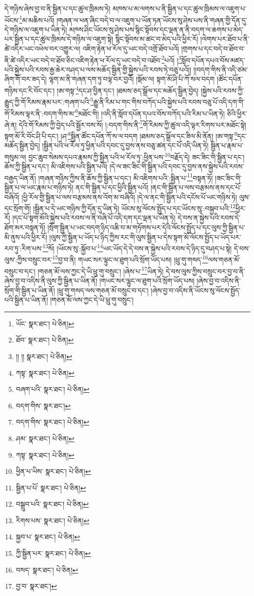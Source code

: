 དེ་གཉིས་ཞེས་བྱ་བ་ནི་སྦྱིན་པ་དང་ཚུལ་ཁྲིམས་ཏེ། མཁས་པ་མ་ལགས་པ་ནི་སྦྱིན་པ་དང་ཚུལ་ཁྲིམས་ལ་འཇུག་པ་ཡོངས་\footnote{ཡོང་  སྣར་ཐང་།  པེ་ཅིན། }མ་མཆིས་པའོ། །གཞན་ལ་ཕན་ཞིང་བདེ་བ་ལ་འཇུག་པ་ཡོན་ཏན་ཡོངས་སུ་ཤེས་པས་ནི་གཞན་གྱི་དོན་དུ་དེ་གཉིས་ལ་འཇུག་པ་ཡིན་ཏེ། མཁས་ཤིང་ཡོངས་སུ་ཤེས་པས་སྙིང་སྟོབས་དང་ལྡན་ན་ནི་བདག་ལ་ཆགས་པ་མེད་པར་སྦྱིན་པ་དང་ཚུལ་ཁྲིམས་དེ་གཉིས་ལ་འཇུག་སྟེ། སྙིང་སྟོབས་མ་ཚང་བ་མེད་པའི་ཕྱིར་རོ། །ལེགས་པར་ཐོབ་པ་ནི་ཚེ་འདིར་ཡང་འཕེལ་བར་འགྱུར་ལ། འཇིག་རྟེན་ཕ་རོལ་དུ་ཡང་བདེ་འགྲོ་ཐོབ་པའོ། །གྲགས་པ་དང་བདེ་བ་ཐོབ་བ་ནི་ཚེ་འདིར་ཡང་བདེ་བ་ཐོབ་ཅིང་འཇིག་རྟེན་ཕ་རོལ་དུ་ཡང་བདེ་བ་འཐོབ་\footnote{ཐོབ་  སྣར་ཐང་།  པེ་ཅིན། }པའོ། །\footnote{།། །།  སྣར་ཐང་།  པེ་ཅིན། }སློབ་དཔོན་དཔའ་བོས་མཛད་པའི་སྐྱེས་པའི་རབས་རྒྱ་ཆེར་བཤད་པ་ལས་མཆོད་སྦྱིན་གྱི་སྐྱེས་པའི་རབས་ཏེ་བཅུ་པའོ།། །།བདག་གིས་ནི་འདི་ཙམ་ཞིག་གོ་བར་ཟད་དེ། ལྷག་མ་ནི་གཞན་དག་ཏུ་བལྟ་བར་བྱའོ། །སྡོམ་ལ། སྟག་མོ་ཤི་པི་ཀོ་སལ་བདག །ཚོང་དཔོན་གཉིས་དང་རི་བོང་དང་། །ཨ་གསྟ་\footnote{ཀསྟ་  སྣར་ཐང་།  པེ་ཅིན། }དང་ཤ་བྱིན་དང་། །ཐམས་ཅད་སྒྲོལ་དང་མཆོད་སྦྱིན་བྱེད། །སྐྱེས་པའི་རབས་ཀྱི་རྒྱུད་ཀྱི་གོ་རིམས་རྣམ་པར་:གཞག་པའི་\footnote{བཞག་པའི་  སྣར་ཐང་།  པེ་ཅིན། }རྒྱུ་ནི་རིམ་པ་གང་གིས་བཀོད་པའི་སྐྱེས་པའི་རབས་བཅུ་པོ་འདི་དག་གི་གོ་རིམས་ལྟར་ནི་:བདག་གིས་མ་\footnote{བདག་གིས་  སྣར་ཐང་། }མཐོང་གི། །འདི་ནི་སློབ་དཔོན་དཔའ་བོས་བཀོད་པའི་རིམ་པ་ཡིན་ཏེ། ཅིའི་ཕྱིར་ཞེ་ན། དེའི་གོ་རིམས་ཀྱི་བྱེད་པའི་སྦྱོར་བས་སོ། །:བདག་གིས་ནི་\footnote{བདག་གིས་  སྣར་ཐང་།  པེ་ཅིན། }གོ་རིམས་ཀྱི་ཚུལ་འདི་ལྟར་རིགས་པར་མཐོང་སྟེ། སྟག་མོ་རི་བོང་ཤི་པི་དང་། །ཤ་\footnote{ཤམ་  སྣར་ཐང་།  པེ་ཅིན། }སྦྱིན་ཚོང་དཔོན་ཀོ་ས་ལ་བདག །ཐམས་ཅད་སྒྲོལ་དང་ཟིལ་མི་ནོན། །ཨ་གསྟ་\footnote{ཀསྟ་  སྣར་ཐང་།  པེ་ཅིན། }དང་མཆོད་སྦྱིན་བྱེད། །སྦྱིན་པའི་ཕ་རོལ་ཏུ་ཕྱིན་པའི་དབང་དུ་བྱས་ནས་བཅུ་ཚན་དང་པོ་འདི་ཡིན་ཏེ། སྦྱིན་པ་རྣམ་པ་གསུམ་ལ། བྱང་ཆུབ་སེམས་དཔའ་རྣམས་ཀྱི་སྦྱིན་པའི་ཕ་རོལ་ཏུ་:ཕྱིན་པས་\footnote{ཕྱིན་པ་ཡིས་  སྣར་ཐང་།  པེ་ཅིན། }བརྗོད་དེ། ཟང་ཟིང་གི་སྦྱིན་པ་དང་། ཆོས་ཀྱི་སྦྱིན་པ་དང་། མི་འཇིགས་པའི་སྦྱིན་པའོ། །དེ་ལ་ཟང་ཟིང་གི་སྦྱིན་པའི་དབང་དུ་བྱས་ནས་སྐྱེས་པའི་རབས་བརྒྱད་ཡིན་ནོ། །གཞན་གཉིས་ཀྱིས་ནི་ཆོས་ཀྱི་སྦྱིན་པ་དང་། མི་འཇིགས་པའི་:སྦྱིན་པ་\footnote{སྦྱིན་པ་པོ་  སྣར་ཐང་།  པེ་ཅིན། }བསྟན་ཏོ། །ཟང་ཟིང་གི་སྦྱིན་པ་ལ་ཡང་རྣམ་པ་གཉིས་ཏེ། ནང་གི་སྦྱིན་པ་དང་ཕྱིའི་སྦྱིན་པའོ། །ནང་གི་སྦྱིན་པ་ལས་བརྩམས་ནས་དང་པོ་བཞིའོ། །ཕྱི་རོལ་གྱི་སྦྱིན་པ་ལས་བརྩམས་ནས་འོག་མ་བཞིའོ། །དེ་ལ་ནང་གི་སྦྱིན་པའི་དངོས་པོ་ཡང་གཉིས་ཏེ། ལུས་དང་སྲོག་གོ། །སྦྱིན་པ་དེ་ཡང་གཉིས་ཀྱི་དོན་དུ་ཡིན་ཏེ། ཡོངས་སུ་ལོངས་སྤྱོད་པ་དང་ཡོངས་སུ་:བསྐྱབ་པའི་\footnote{བསྒྲུབ་པའི་  སྣར་ཐང་།  པེ་ཅིན། }ཕྱིར་རོ། །དང་པོ་སྟག་མོའི་སྐྱེས་པའི་རབས་ལ་ནི་བཞི་པོ་འདི་དག་དང་ལྡན་པ་ཡིན་ཏེ། དེ་བས་ན་སྐྱེས་པའི་རབས་དེ་ཐོག་མར་བསྟན་ཏོ། །སྲོག་སྦྱིན་པ་ཡང་བདག་ཉིད་འཆི་བ་མ་གཏོགས་པར་དེའི་ལོངས་སྤྱོད་པ་དང་ལུས་ཀྱི་སྦྱིན་པ་མི་ནུས་པའི་ཕྱིར་རོ། །ལུས་ཀྱི་སྦྱིན་པ་ཡོད་པ་ཉིད་ཀྱིས་རང་གི་ལུས་སྦྱིན་པ་དེས་སྟག་མོ་ལོངས་སྤྱོད་པ་ཡོད་པར་རབ་ཏུ་:རིག་པས་\footnote{རིགས་པས་  སྣར་ཐང་།  པེ་ཅིན། }སོ། །ཡོངས་སུ་:སྐྱོབ་པ་\footnote{སྐྱབ་པ་  སྣར་ཐང་།  པེ་ཅིན། }ཡང་ཡོད་དེ་དེ་བས་ན་སྐྱེས་པའི་རབས་དེ་ཉིད་དུ་བཤད་པ་སྟེ། དེ་བས་ལུས་:ཀྱིས་བསྲུང་བར་\footnote{ཀྱི་སྦྱིན་པར་  སྣར་ཐང་།  པེ་ཅིན། }བྱ་བ་ནི། གཡང་སར་ལྟུང་ལ་ཐུག་པའི་སྲོག་ཡོད་པས། །ཕྲུ་གུ་གསད་\footnote{བསད་  སྣར་ཐང་།  པེ་ཅིན། }ལས་གཅན་མོ་བསྲུང་བ་དང་། །གཅན་མོ་ལས་ཀྱང་དེ་ཡི་ཕྲུ་གུ་བསྲུང་། །ཞེས་པ་\footnote{བྱ་བ་  སྣར་ཐང་། }ཡིན་ཏེ། དེ་བས་ལུས་ཀྱིས་བསྲུང་བར་བྱ་བ་ནི་ཞེས་བྱ་བ་འདིས་ནི་ལུས་ཀྱི་སྦྱིན་པ་ཡིན་ནོ། །གཡང་སར་ལྷུང་ལ་ཐུག་པའི་སྲོག་ཡོད་པས། །ཞེས་བྱ་བ་འདིས་ནི་སྲོག་གི་སྦྱིན་པ་ཡིན་ནོ། །ཕྲུ་གུ་གསད་ལས་གཅན་མོ་བསྲུང་བ་དང་། །ཞེས་བྱ་བ་འདིས་ནི་ཡོངས་སུ་ལོངས་སྤྱོད་པའི་སྦྱིན་པ་ཡིན་ནོ། །གཅན་མོ་ལས་ཀྱང་དེ་ཡི་ཕྲུ་གུ་བསྲུང་། 